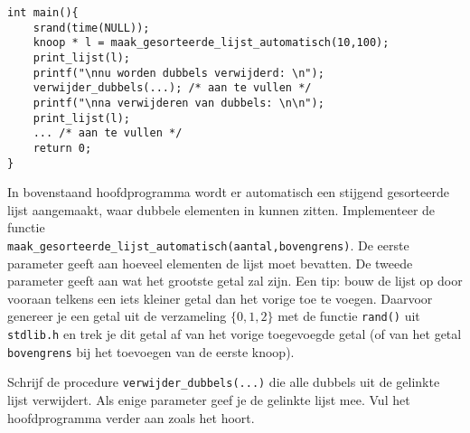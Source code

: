 \beginoef
\begin{footnotesize}
\begin{verbatim}
int main(){
    srand(time(NULL));
    knoop * l = maak_gesorteerde_lijst_automatisch(10,100);
    print_lijst(l);
    printf("\nnu worden dubbels verwijderd: \n");
    verwijder_dubbels(...); /* aan te vullen */
    printf("\nna verwijderen van dubbels: \n\n");
    print_lijst(l);	
    ... /* aan te vullen */
    return 0;
}
\end{verbatim}
\end{footnotesize}
In bovenstaand hoofdprogramma wordt er automatisch een stijgend gesorteerde lijst aangemaakt, waar dubbele elementen in kunnen zitten. Implementeer de functie
\\\verb}maak_gesorteerde_lijst_automatisch(aantal,bovengrens)}. De eerste parameter geeft aan hoe\-veel elementen de lijst moet bevatten. De tweede parameter geeft
aan wat het grootste getal zal zijn. Een tip: bouw de lijst op door vooraan telkens een iets kleiner getal dan het vorige toe te voegen. Daarvoor genereer je
een getal uit de verzameling $\{0,1,2\}$ met de functie \verb}rand()} uit \verb}stdlib.h} en trek je dit getal af van het vorige toegevoegde getal (of van het getal \verb{bovengrens{ bij het toevoegen van de eerste knoop).

Schrijf de procedure \verb}verwijder_dubbels(...)} die alle dubbels uit de gelinkte lijst verwijdert. Als enige parameter
geef je de gelinkte lijst mee. Vul het hoofdprogramma verder aan zoals het hoort.
\endoef
